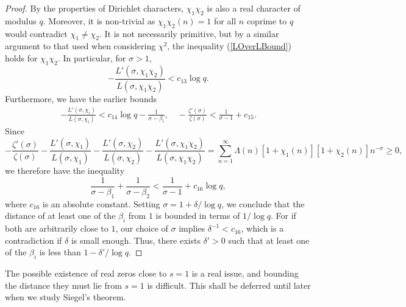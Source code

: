 \begin{proof}
By the properties of Dirichlet characters, $\chi_1 \chi_2$ is also a real character of modulus $q$. Moreover, it is non-trivial as $\chi_1 \chi_2 (n) = 1$ for all $n$ coprime to $q$ would contradict $\chi_1 \neq \chi_2$. It is not necessarily primitive, but by a similar argument to that used when considering $\chi^{2}$, the inequality (\ref{LOverLBound}) holds for $\chi_1 \chi_2$. In particular, for $\sigma > 1$,
\begin{equation}
    -\frac{L'(\sigma, \chi_1 \chi_2)}{L(\sigma, \chi_1 \chi_2)} < c_{13}\log q . \nonumber
\end{equation}
Furthermore, we have the earlier bounds
\begin{align}
    -\frac{L'(\sigma, \chi_i)}{L(\sigma, \chi_{i})} < c_{14} \log q - \frac{1}{\sigma - \beta_i}, \quad
    -\frac{\zeta'(\sigma)}{\zeta(\sigma)} < \frac{1}{\sigma - 1} + c_{15}. \nonumber
\end{align}
Since 
\begin{equation}
    -\frac{\zeta'(\sigma)}{\zeta(\sigma)} - \frac{L'(\sigma, \chi_1)}{L(\sigma, \chi_1)} - \frac{L'(\sigma, \chi_2)}{L(\sigma, \chi_2)} - \frac{L'(\sigma, \chi_1 \chi_2)}{L(\sigma, \chi_1 \chi_2)} = \sum_{n=1}^{\infty} \Lambda(n) [1 + \chi_1(n)][1 + \chi_2(n)]n^{-\sigma} \geq 0, \nonumber
\end{equation}
we therefore have the inequality
\begin{equation}
    \frac{1}{\sigma - \beta_1} + \frac{1}{\sigma - \beta_2} < \frac{1}{\sigma - 1} + c_{16}\log q, \nonumber
\end{equation}
where $c_{16}$ is an absolute constant. Setting $\sigma = 1 + \delta/\log q$, we conclude that the distance of at least one of the $\beta_{i}$ from $1$ is bounded in terms of $1/\log q$. For if both are arbitrarily close to $1$, our choice of $\sigma$ implies $\delta^{-1} < c_{16}$, which is a contradiction if $\delta$ is small enough. Thus, there exists $\delta' > 0$ such that at least one of the $\beta_{i}$ is less than $1 - \delta'/\log q$. 
\end{proof}

The possible existence of real zeros close to $s=1$ is a real issue, and bounding the distance they must lie from $s=1$ is difficult. This shall be deferred until later when we study Siegel's theorem.
